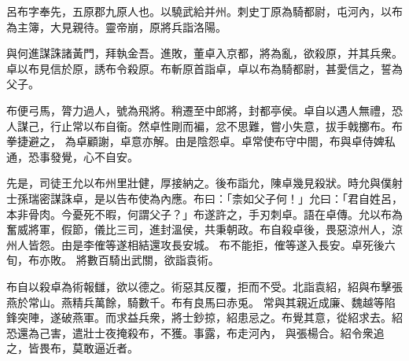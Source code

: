 \begin{pinyinscope}
 
 
 呂布字奉先，五原郡九原人也。以驍武給并州。刺史丁原為騎都尉，屯河內，以布為主簿，大見親待。靈帝崩，原將兵詣洛陽。
 
 
 與何進謀誅諸黃門，拜執金吾。進敗，董卓入京都，將為亂，欲殺原，并其兵衆。卓以布見信於原，誘布令殺原。布斬原首詣卓，卓以布為騎都尉，甚愛信之，誓為父子。
 
 
布便弓馬，膂力過人，號為飛將。稍遷至中郎將，封都亭侯。卓自以遇人無禮，恐人謀己，行止常以布自衞。然卓性剛而褊，忿不思難，嘗小失意，拔手戟擲布。布拳捷避之，
 為卓顧謝，卓意亦解。由是陰怨卓。卓常使布守中閤，布與卓侍婢私通，恐事發覺，心不自安。
 
 
先是，司徒王允以布州里壯健，厚接納之。後布詣允，陳卓幾見殺狀。時允與僕射士孫瑞密謀誅卓，是以告布使為內應。布曰：「柰如父子何！」允曰：「君自姓呂，本非骨肉。今憂死不暇，何謂父子？」布遂許之，手刃刺卓。語在卓傳。允以布為奮威將軍，假節，儀比三司，進封溫侯，共秉朝政。布自殺卓後，畏惡涼州人，涼州人皆怨。由是李傕等遂相結還攻長安城。
 布不能拒，傕等遂入長安。卓死後六旬，布亦敗。
 將數百騎出武關，欲詣袁術。
 
 
布自以殺卓為術報讎，欲以德之。術惡其反覆，拒而不受。北詣袁紹，紹與布擊張燕於常山。燕精兵萬餘，騎數千。布有良馬曰赤兎。
 常與其親近成廉、魏越等陷鋒突陣，遂破燕軍。而求益兵衆，將士鈔掠，紹患忌之。布覺其意，從紹求去。紹恐還為己害，遣壯士夜掩殺布，不獲。事露，布走河內，
 與張楊合。紹令衆追之，皆畏布，莫敢逼近者。
 
 
\end{pinyinscope}
